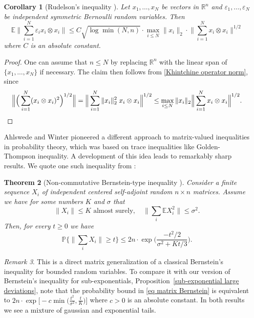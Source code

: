 \documentclass[10pt, openany]{book}
\newtheorem{theorem}{Theorem}[chapter]
\newtheorem{corollary}[theorem]{Corollary}
\theoremstyle{remark}
\newtheorem{remark}[theorem]{Remark}
\def \R {\mathbb{R}}
\def \E {\mathbb{E}}
\def \P {\mathbb{P}}
\def \e {\varepsilon}
\def \s {\sigma}
\begin{document}
\begin{corollary}[Rudelson's inequality \cite{Rudelson isotropic}]		\label{Rudelson}
  Let $x_1, \ldots, x_N$ be vectors in $\R^n$ and
  $\e_1, \ldots, \e_N$ be independent symmetric Bernoulli random variables. 
  Then 
  $$
  \E \Big\| \sum_{i=1}^N \e_i x_i \otimes x_i \Big\|
  \le C \sqrt{\log \min(N,n)} \cdot \max_{i \le N} \|x_i\|_2 \cdot \Big\| \sum_{i=1}^N x_i \otimes x_i \Big\|^{1/2}
  $$ 
  where $C$ is an absolute constant.
\end{corollary}

\begin{proof}
One can assume that $n \le N$ by replacing $\R^n$ with the linear span of $\{x_1,\ldots,x_N\}$
if necessary. The claim then follows from \eqref{Khintchine operator norm}, since 
$$
\Big\| \Big( \sum_{i=1}^N (x_i \otimes x_i)^2 \Big)^{1/2} \Big\|
= \Big\| \sum_{i=1}^N \|x_i\|_2^2 \; x_i \otimes x_i \Big\|^{1/2}
\le \max_{i \le N} \|x_i\|_2 \Big\| \sum_{i=1}^N x_i \otimes x_i \Big\|^{1/2}. \qedhere
$$
\end{proof}

Ahlswede and Winter \cite{AW} pioneered a different approach to matrix-valued 
inequalities in probability theory, which was based on trace inequalities like Golden-Thompson 
inequality. A development of this idea leads to remarkably sharp results. We quote one such inequality 
from \cite{Tropp}:

\begin{theorem}[Non-commutative Bernstein-type inequality \cite{Tropp}]	
  			\label{matrix Bernstein}
  Consider a finite sequence $X_i$ of independent centered self-adjoint random $n \times n$ matrices. 
  Assume we have for some numbers $K$ and $\s$ that  
  $$
  \|X_i\| \le K \text{ almost surely}, \quad \big\| \sum_i \E X_i^2 \big\| \le \s^2.
  $$
  Then, for every $t \ge 0$ we have
  \begin{equation}							\label{eq matrix Bernstein}
  \P \Big\{ \big\| \sum_i X_i \big\| \ge t \Big\} \le 2 n \cdot \exp \Big( \frac{-t^2/2}{\s^2 + Kt/3} \Big).
  \end{equation}
\end{theorem}

\begin{remark}				\label{mixed tail}
  This is a direct matrix generalization of a classical Bernstein's inequality for bounded random variables. 
  To compare it with our version of Bernstein's inequality for sub-exponentials, 
  Proposition~\ref{sub-exponential large deviations},
  note that the probability bound in \eqref{eq matrix Bernstein} is equivalent to  
  $2n \cdot \exp \big[ -c \min \big( \frac{t^2}{\s^2}, \frac{t}{K} \big) \big]$ where $c>0$ is an absolute constant. 
  In both results we see a mixture of gaussian and exponential tails.
\end{remark}
\end{document}
